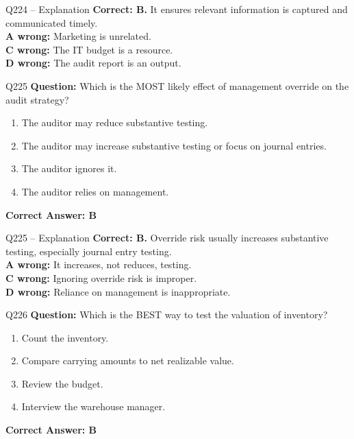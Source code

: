 \documentclass[aspectratio=169,10pt]{beamer}
\begin{document}
	\begin{frame}[t]{Q224 -- Explanation}
		\small
		\textbf{Correct: B.} It ensures relevant information is captured and communicated timely. \\[4pt]
		\textbf{A wrong:} Marketing is unrelated. \\[2pt]
		\textbf{C wrong:} The IT budget is a resource. \\[2pt]
		\textbf{D wrong:} The audit report is an output.
	\end{frame}
	
	\begin{frame}[t]{Q225}
		\small
		\textbf{Question:} Which is the MOST likely effect of management override on the audit strategy?
		\begin{enumerate}[label=\Alph*.,itemsep=1pt,topsep=2pt]
			\item The auditor may reduce substantive testing.
			\item The auditor may increase substantive testing or focus on journal entries.
			\item The auditor ignores it.
			\item The auditor relies on management.
		\end{enumerate}
		\vspace{4pt}
		\textbf{Correct Answer: B}
	\end{frame}
	
	\begin{frame}[t]{Q225 -- Explanation}
		\small
		\textbf{Correct: B.} Override risk usually increases substantive testing, especially journal entry testing. \\[4pt]
		\textbf{A wrong:} It increases, not reduces, testing. \\[2pt]
		\textbf{C wrong:} Ignoring override risk is improper. \\[2pt]
		\textbf{D wrong:} Reliance on management is inappropriate.
	\end{frame}
	
	\begin{frame}[t]{Q226}
		\small
		\textbf{Question:} Which is the BEST way to test the valuation of inventory?
		\begin{enumerate}[label=\Alph*.,itemsep=1pt,topsep=2pt]
			\item Count the inventory.
			\item Compare carrying amounts to net realizable value.
			\item Review the budget.
			\item Interview the warehouse manager.
		\end{enumerate}
		\vspace{4pt}
		\textbf{Correct Answer: B}
	\end{frame}
	
\end{document}
